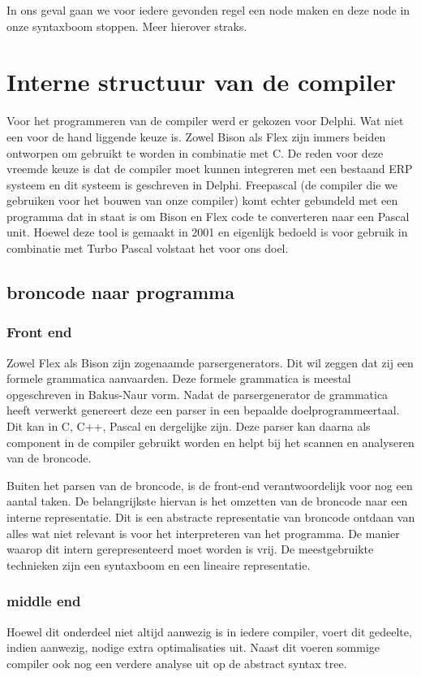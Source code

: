 \documentclass[10pt,a4paper]{article}
\begin{document}
In ons geval gaan we voor iedere gevonden regel een node maken en deze node in onze syntaxboom stoppen. Meer hierover straks.

\section{Interne structuur van de compiler}
Voor het programmeren van de compiler werd er gekozen voor Delphi. Wat niet een voor de hand liggende keuze is. Zowel Bison als Flex zijn immers beiden ontworpen om gebruikt te worden in combinatie met C. De reden voor deze vreemde keuze is dat de compiler moet kunnen integreren met een bestaand ERP systeem en dit systeem is geschreven in Delphi. Freepascal (de compiler die we gebruiken voor het bouwen van onze compiler) komt echter gebundeld met een programma dat in staat is om Bison en Flex code te converteren naar een Pascal unit. Hoewel deze tool is gemaakt in 2001 en eigenlijk bedoeld is voor gebruik in combinatie met Turbo Pascal volstaat het voor ons doel.

\subsection{broncode naar programma}

\subsubsection{Front end}
Zowel Flex als Bison zijn zogenaamde parsergenerators. Dit wil zeggen dat zij een formele grammatica aanvaarden. Deze formele grammatica is meestal opgeschreven in Bakus-Naur vorm. Nadat de parsergenerator de grammatica heeft verwerkt genereert deze een parser in een bepaalde doelprogrammeertaal. Dit kan in C, C++, Pascal en dergelijke zijn. Deze parser kan daarna als component in de compiler gebruikt worden en helpt bij het scannen en analyseren van de broncode.

Buiten het parsen van de broncode, is de front-end verantwoordelijk voor nog een aantal taken. De belangrijkste hiervan is het omzetten van de broncode naar een interne representatie. Dit is een abstracte representatie van broncode ontdaan van alles wat niet relevant is voor het interpreteren van het programma. De manier waarop dit intern gerepresenteerd moet worden is vrij. De meestgebruikte technieken zijn een syntaxboom en een lineaire representatie. 

\subsubsection{middle end}
Hoewel dit onderdeel niet altijd aanwezig is in iedere compiler, voert dit gedeelte, indien aanwezig, nodige extra optimalisaties uit. Naast dit voeren sommige compiler ook nog een verdere analyse uit op de abstract syntax tree.
\end{document}
